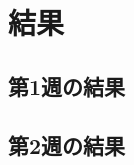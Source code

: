 \documentclass[dvipdfmx]{jreport}
\begin{document}
\chapter{結果}

\section{第1週の結果}

\section{第2週の結果}
\end{document}
